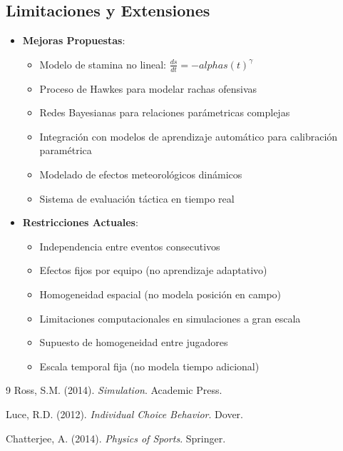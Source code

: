 \documentclass{article}
\begin{document}
\subsection{Limitaciones y Extensiones}
\begin{itemize}
    \item \textbf{Mejoras Propuestas}:
    \begin{itemize}
        \item Modelo de stamina no lineal: $\frac{ds}{dt} = -alpha s(t)^\gamma$
        \item Proceso de Hawkes para modelar rachas ofensivas
        \item Redes Bayesianas para relaciones parámetricas complejas
        \item Integración con modelos de aprendizaje automático para calibración paramétrica
        \item Modelado de efectos meteorológicos dinámicos
        \item Sistema de evaluación táctica en tiempo real
    \end{itemize}

    \item \textbf{Restricciones Actuales}:
    \begin{itemize}
        \item Independencia entre eventos consecutivos
        \item Efectos fijos por equipo (no aprendizaje adaptativo)
        \item Homogeneidad espacial (no modela posición en campo)
        \item Limitaciones computacionales en simulaciones a gran escala
        \item Supuesto de homogeneidad entre jugadores
        \item Escala temporal fija (no modela tiempo adicional)
    \end{itemize}
\end{itemize}

\begin{thebibliography}{9}
Ross, S.M. (2014). \textit{Simulation}. Academic Press.

Luce, R.D. (2012). \textit{Individual Choice Behavior}. Dover.

Chatterjee, A. (2014). \textit{Physics of Sports}. Springer.
\end{thebibliography}


\
\end{document}
